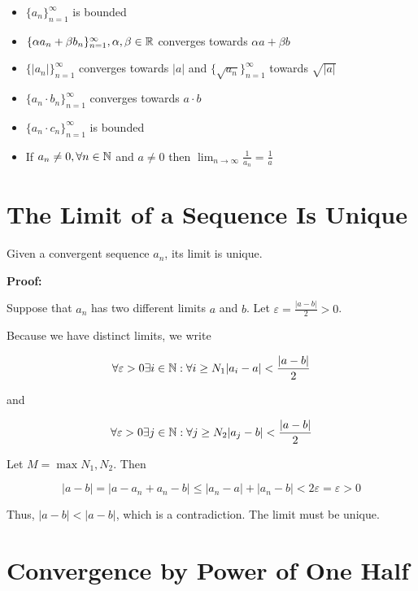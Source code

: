 \begin{itemize}

	\item \(\{a_n\}_{n = 1}^{\infty}\) is bounded

	\item \(\{\alpha a_n + \beta b_n\}_{n = 1}^{\infty}, \alpha, \beta \in \mathbb{R}\) converges towards \(\alpha a + \beta b\)

	\item \(\{|a_n|\}_{n = 1}^{\infty}\) converges towards \(|a|\) and \(\{\sqrt{a_n}\}_{n = 1}^{\infty}\) towards \(\sqrt{|a|}\)

	\item \(\{a_n \cdot b_n\}_{n = 1}^{\infty}\) converges towards \(a \cdot b\)

	\item \(\{a_n \cdot c_n\}_{n = 1}^{\infty}\) is bounded

	\item If \(a_n \ne 0, \forall n \in \mathbb{N}\) and \(a \ne 0\) then \(\lim_{n \to \infty} \frac{1}{a_n} = \frac{1}{a}\)

\end{itemize}

\section{The Limit of a Sequence Is Unique}

Given a convergent sequence \(a_n\), its limit is unique.

\textbf{Proof:}

Suppose that \(a_n\) has two different limits \(a\) and \(b\). Let \( \varepsilon = \frac{|a - b|}{2} > 0\).

Because we have distinct limits, we write

\[
	\forall \varepsilon > 0 \exists i \in \mathbb{N}: \forall i \ge N_1 |a_i - a| < \frac{|a - b|}{2}
\]

and

\[
	\forall \varepsilon > 0 \exists j \in \mathbb{N}: \forall j \ge N_2 |a_j - b| < \frac{|a - b|}{2}
\]

Let \(M = \max{N_1, N_2}\). Then

\[
	|a - b| = |a - a_n + a_n - b| \le  |a_n - a| + |a_n - b| < 2 \varepsilon = \varepsilon > 0
\]

Thus, \(|a - b| < |a - b|\), which is a contradiction. The limit must be unique.

\QED

\section{Convergence by Power of One Half}

